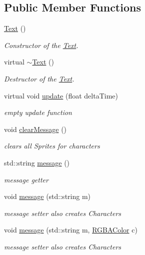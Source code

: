 \subsection*{Public Member Functions}
\begin{DoxyCompactItemize}
\item 
\hyperlink{class_text_ab3e26143fccc52699bcc5149cae852bc}{Text} ()
\begin{DoxyCompactList}\small\item\em Constructor of the \hyperlink{class_text}{Text}. \end{DoxyCompactList}\item 
\mbox{\label{class_text_a2d49e5c280e205125b149f7777ae30c7}} 
virtual \hyperlink{class_text_a2d49e5c280e205125b149f7777ae30c7}{$\sim$\+Text} ()
\begin{DoxyCompactList}\small\item\em Destructor of the \hyperlink{class_text}{Text}. \end{DoxyCompactList}\item 
\mbox{\label{class_text_a5604f1f74fd487d2972d024575497484}} 
virtual void \hyperlink{class_text_a5604f1f74fd487d2972d024575497484}{update} (float delta\+Time)
\begin{DoxyCompactList}\small\item\em empty update function \end{DoxyCompactList}\item 
void \hyperlink{class_text_afdd312f98458f1bb34efd9112600cf2d}{clear\+Message} ()
\begin{DoxyCompactList}\small\item\em clears all Sprites for characters \end{DoxyCompactList}\item 
std\+::string \hyperlink{class_text_af104dcc0d17a6c0d211eebd034fd1e19}{message} ()
\begin{DoxyCompactList}\small\item\em message getter \end{DoxyCompactList}\item 
void \hyperlink{class_text_abebd1a39cf62aab521a0a43657c63570}{message} (std\+::string m)
\begin{DoxyCompactList}\small\item\em message setter also creates Characters \end{DoxyCompactList}\item 
void \hyperlink{class_text_a0138a1f302a7a68eca9373413463ae43}{message} (std\+::string m, \hyperlink{struct_r_g_b_a_color}{R\+G\+B\+A\+Color} c)
\begin{DoxyCompactList}\small\item\em message setter also creates Characters \end{DoxyCompactList}\end{DoxyCompactItemize}
